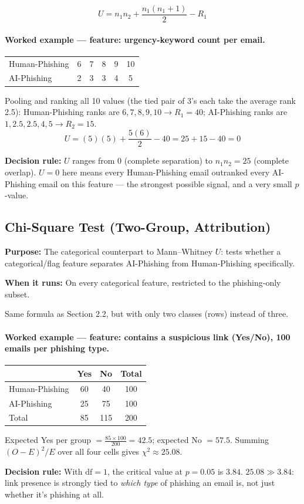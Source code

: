 \documentclass[11pt]{article}
\newcommand{\purpose}[1]{\par\noindent\textbf{Purpose:} #1\par}
\newcommand{\whenrun}[1]{\par\noindent\textbf{When it runs:} #1\par}
\newcommand{\decision}[1]{\par\noindent\textbf{Decision rule:} #1\par}
\begin{document}
\[
U = n_1 n_2 + \frac{n_1(n_1+1)}{2} - R_1
\]

\paragraph{Worked example --- feature: urgency-keyword count per email.}
\begin{center}
\begin{tabular}{lccccc}
\toprule
Human-Phishing & 6 & 7 & 8 & 9 & 10 \\
AI-Phishing & 2 & 3 & 3 & 4 & 5 \\
\bottomrule
\end{tabular}
\end{center}
Pooling and ranking all 10 values (the tied pair of 3's each take the average rank 2.5): Human-Phishing
ranks are $6,7,8,9,10 \to R_1=40$; AI-Phishing ranks are $1,2.5,2.5,4,5 \to R_2=15$.
\[
U = (5)(5) + \frac{5(6)}{2} - 40 = 25+15-40 = 0
\]
\decision{$U$ ranges from $0$ (complete separation) to $n_1 n_2=25$ (complete overlap). $U=0$ here means
every Human-Phishing email outranked every AI-Phishing email on this feature --- the strongest possible
signal, and a very small $p$-value.}

\subsection{Chi-Square Test (Two-Group, Attribution)}
\purpose{The categorical counterpart to Mann--Whitney $U$: tests whether a categorical/flag feature
separates AI-Phishing from Human-Phishing specifically.}
\whenrun{On every categorical feature, restricted to the phishing-only subset.}

Same formula as Section 2.2, but with only two classes (rows) instead of three.

\paragraph{Worked example --- feature: contains a suspicious link (Yes/No), 100 emails per phishing type.}
\begin{center}
\begin{tabular}{lccc}
\toprule
 & Yes & No & Total \\
\midrule
Human-Phishing & 60 & 40 & 100 \\
AI-Phishing & 25 & 75 & 100 \\
\midrule
Total & 85 & 115 & 200 \\
\bottomrule
\end{tabular}
\end{center}
Expected Yes per group $=\frac{85\times100}{200}=42.5$; expected No $=57.5$. Summing $(O-E)^2/E$ over all
four cells gives $\chi^2 \approx 25.08$.
\decision{With $\mathrm{df}=1$, the critical value at $p=0.05$ is $3.84$. $25.08 \gg 3.84$: link
presence is strongly tied to \emph{which type} of phishing an email is, not just whether it's phishing
at all.}
\end{document}
